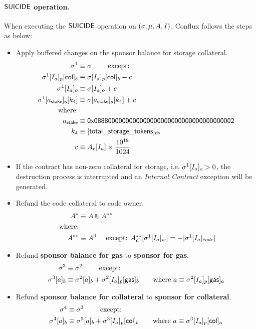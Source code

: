 \paragraph{$\mathsf{SUICIDE}$ operation.} When executing the $\mathsf{SUICIDE}$ operation on $(\mathbf{\sigma},\mu,A,I)$, Conflux follows the steps as below:
\begin{itemize}[nosep]
	\item Apply buffered changes on the sponsor balance for storage collateral. 
	\begin{align}
		\st^1  &\eqdef \st \qquad \mbox{ except:}\label{eq:suicide_start}\\
		\st^1[I_a]_p[{\sf col}]_b &\eqdef \st[I_a]_p[{\sf col}]_b - c \\
		\st^1[I_a]_o &\eqdef \st[I_a]_o + c \\
		\st^1[a_{\sf stake}]_{\bf s}[k_4] &\eqdef \st[a_{\sf stake}]_{\bf s}[k_4] + c \\
		\mbox{where:} & \\
		a_{\sf stake} &\eqdef \stakingcontract \\ 
		k_4 &\eqdef {\sf [total\char`_storage\char`_tokens]_{\sf ch}} \\ 
		c &\eqdef A_{\bf c}[I_a]\times \collateralperbyte 
	\end{align}

	\item If the contract has non-zero collateral for storage, i.e. $\mathbf{\sigma}^1[I_a]_o>0$, 
	the destruction process is interrupted and an \emph{Internal Contract} exception will be generated.

	\item Refund the code collateral to code owner. 
	\begin{align}
		A^{*} &\equiv A \Cup A^{**} \\ 
		\mbox{ where:}& \\ 
		A^{**} &\equiv A^0 \quad \mbox{ except: $A^{**}_{\bf c}[\mathbf{\sigma}^1[I_a]_w]=-|\mathbf{\sigma}^1[I_a]_{code}|$}
	\end{align}

	\item Refund {\bf sponsor balance for gas} to {\bf sponsor for gas}.
	\begin{align}
		\mathbf{\sigma}^3  &\equiv \mathbf{\sigma}^2 \qquad \mbox{  except:}\\
		\mathbf{\sigma}^3[a]_b&\equiv\mathbf{\sigma}^2[a]_b+\mathbf{\sigma}^2[I_a]_p[{\sf gas}]_b
		\qquad\text{where $a  \equiv \mathbf{\sigma}^2[I_a]_p[{\sf gas}]_a$}
	\end{align}

	\item Refund {\bf sponsor balance for collateral} to {\bf sponsor for collateral}.
	\begin{align}
		\mathbf{\sigma}^4  &\equiv \mathbf{\sigma}^3 \qquad \mbox{  except:}\\
		\mathbf{\sigma}^4[a]_b&\equiv\mathbf{\sigma}^3[a]_b+\mathbf{\sigma}^3[I_a]_p[{\sf col}]_b
		\qquad\text{where $a \equiv \mathbf{\sigma}^3[I_a]_p[{\sf col}]_a$}
	\end{align}


\end{itemize}

